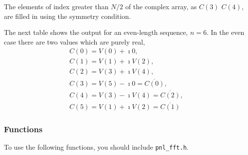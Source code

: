 The elements of index greater than $N/2$ of the complex array, as $C(3)$
$C(4)$, are filled in using the symmetry condition.

The next table shows the output for an even-length sequence, $n=6$.
In the even case there are two values which are purely real, 
\begin{equation}
  \begin{array}{l}
         C(0) =  V(0) + \imath 0, \\ 
         C(1) =  V(1) + \imath V(2), \\
         C(2) =  V(3) + \imath V(4), \\
         C(3) = V(5) - \imath 0    =  \overline{C(0)} , \\
         C(4) = V(3) - \imath V(4) =  \overline{C(2)} , \\
         C(5) = V(1) + \imath V(2) =  \overline{C(1)} 
  \end{array}   
 \end{equation}


\subsubsection{Functions}

To use the following functions, you should include \verb!pnl_fft.h!.

